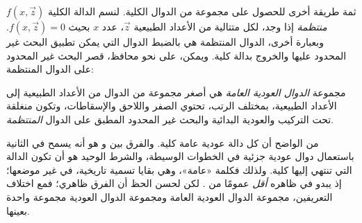\documentclass[../../../include/open-logic-section]{subfiles}
\begin{document}

ثمة طريقة أخرى للحصول على مجموعة من الدوال الكلية. لنسم الدالة الكلية
$f(x,\vec z)$ \emph{منتظمة} إذا وجد، لكل متتالية من الأعداد الطبيعية
$\vec z$، عدد $x$ بحيث $f(x,\vec z)=0$. وبعبارة أخرى، الدوال المنتظمة
هي بالضبط الدوال التي يمكن تطبيق البحث غير المحدود عليها والخروج بدالة
كلية. ويمكن، على نحو محافظ، قصر البحث غير المحدود على الدوال المنتظمة:

\begin{defn}
مجموعة \emph{الدوال العودية العامة} هي أصغر مجموعة من الدوال من
الأعداد الطبيعية إلى الأعداد الطبيعية، بمختلف الرتب، تحتوي الصفر
واللاحق والإسقاطات، وتكون منغلقة تحت التركيب والعودية البدائية والبحث
غير المحدود المطبق على الدوال \emph{المنتظمة}.
\end{defn}

من الواضح أن كل دالة عودية عامة كلية. والفرق بين
 و هو أنه
يسمح في الثانية باستعمال دوال عودية جزئية في الخطوات الوسيطة، والشرط
الوحيد هو أن تكون الدالة التي تنتهي إليها كلية. ولذلك فكلمة «عامة»،
وهي بقايا تسمية تاريخية، في غير موضعها؛ إذ يبدو
 في ظاهره \emph{أقل} عمومًا من
. لكن لحسن الحظ أن الفرق ظاهري؛ فمع
اختلاف التعريفين، مجموعة الدوال العودية العامة ومجموعة الدوال العودية
مجموعة واحدة بعينها.
\end{document}
